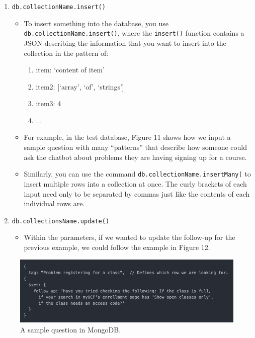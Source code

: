 \documentclass[titlepage, 12pt]{article}
\begin{document}
\begin{enumerate}
    \item \texttt{db.collectionName.insert()}
    \begin{itemize}
        \item To insert something into the database, you use \texttt{db.collectionName.insert()}, where the \texttt{insert()} function contains a JSON describing the information that you want to insert into the collection in the pattern of:
        \begin{enumerate}
            \item item: ‘content of item’
            \item item2: [‘array’, ‘of’, ‘strings’]
            \item item3: 4
            \item $\dots$
        \end{enumerate}
        \item For example, in the test database, Figure 11 shows how we input a sample question with many “patterns” that describe how someone could ask the chatbot about problems they are having signing up for a course.
        \item Similarly, you can use the command \texttt{db.collectionName.insertMany(} to insert multiple rows into a collection at once. The curly brackets of each input need only to be separated by commas just like the contents of each individual rows are.
    \end{itemize}
    \item \texttt{db.collectionsName.update()}
    \begin{itemize}
        \item Within the parameters, if we wanted to update the follow-up for the previous example, we could follow the example in Figure 12.
    \end{itemize}
\end{enumerate}

\begin{figure}[h]
    \centering\includegraphics[width=0.75\linewidth]{images/mongodb-commands-1.png}
    \caption{A sample question in MongoDB.}
\end{figure}
\end{document}
